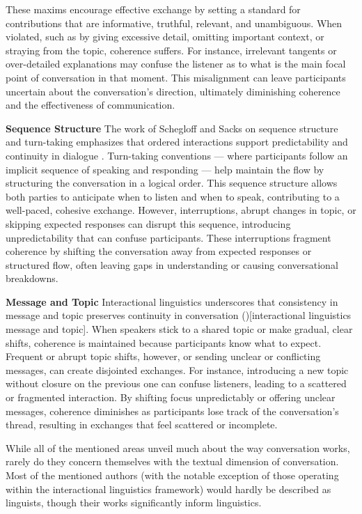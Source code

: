 \documentclass[12pt]{report}
\begin{document}
{These maxims encourage effective exchange by setting a standard for contributions that are informative, truthful, relevant, and unambiguous. When violated, such as by giving excessive detail, omitting important context, or straying from the topic, coherence suffers. For instance, irrelevant tangents or over-detailed explanations may confuse the listener as to what is the main focal point of conversation in that moment. This misalignment can leave participants uncertain about the conversation’s direction, ultimately diminishing coherence and the effectiveness of communication.

\par{\textbf{Sequence Structure}}
The work of Schegloff and Sacks on sequence structure and turn-taking emphasizes that ordered interactions support predictability and continuity in dialogue \cite{Schegloff_2007}. Turn-taking conventions — where participants follow an implicit sequence of speaking and responding — help maintain the flow by structuring the conversation in a logical order. This sequence structure allows both parties to anticipate when to listen and when to speak, contributing to a well-paced, cohesive exchange. However, interruptions, abrupt changes in topic, or skipping expected responses can disrupt this sequence, introducing unpredictability that can confuse participants. These interruptions fragment coherence by shifting the conversation away from expected responses or structured flow, often leaving gaps in understanding or causing conversational breakdowns.

\par{\textbf{Message and Topic}}
Interactional linguistics underscores that consistency in message and topic preserves continuity in conversation ()[interactional linguistics message and topic]. When speakers stick to a shared topic or make gradual, clear shifts, coherence is maintained because participants know what to expect. Frequent or abrupt topic shifts, however, or sending unclear or conflicting messages, can create disjointed exchanges. For instance, introducing a new topic without closure on the previous one can confuse listeners, leading to a scattered or fragmented interaction. By shifting focus unpredictably or offering unclear messages, coherence diminishes as participants lose track of the conversation’s thread, resulting in exchanges that feel scattered or incomplete.

\par
While all of the mentioned areas unveil much about the way conversation works,
rarely do they concern themselves with the textual dimension of conversation.
Most of the mentioned authors (with the notable exception of those operating within the interactional linguistics framework) would hardly be described as linguists,
though their works significantly inform linguistics.

}
\end{document}
